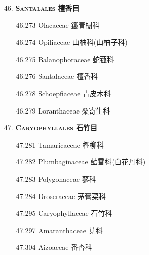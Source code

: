 \begin{enumerate}
  \item[46. ] \textbf{\textsc{Santalales} 檀香目}   
    \begin{enumerate}
      \item[46.273] Olacaceae 鐵青樹科     
        
      \item[46.274] Opiliaceae 山柚科(山柚子科)     
        
      \item[46.275] Balanophoraceae 蛇菰科     
        
      \item[46.276] Santalaceae 檀香科     
        
      \item[46.278] Schoepfiaceae 青皮木科     
        
      \item[46.279] Loranthaceae 桑寄生科     
        
    \end{enumerate}
  \item[47. ] \textbf{\textsc{Caryophyllales} 石竹目}   
    \begin{enumerate}
      \item[47.281] Tamaricaceae 檉柳科     
        
      \item[47.282] Plumbaginaceae 藍雪科(白花丹科)     
        
      \item[47.283] Polygonaceae 蓼科     
        
      \item[47.284] Droseraceae 茅膏菜科     
        
      \item[47.295] Caryophyllaceae 石竹科     
        
      \item[47.297] Amaranthaceae 莧科     
        
      \item[47.304] Aizoaceae 番杏科     
        

\end{enumerate}
\end{enumerate}

